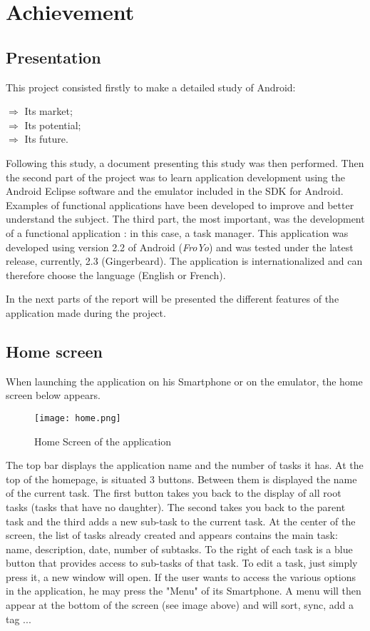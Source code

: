 \chapter{Achievement}

\section{Presentation}

This project consisted firstly to make a detailed study of Android:
\begin{description}
    \item[$\Rightarrow$ Its market;]
    \item[$\Rightarrow$ Its potential;]
    \item[$\Rightarrow$ Its future.]
\end{description}

\noindent Following this study, a document presenting this study was then performed.
Then the second part of the project was to learn application development using the Android Eclipse software and the emulator included in the SDK for Android.
Examples of functional applications have been developed to improve and better understand the subject.
The third part, the most important, was the development of a functional application : in this case, a task manager. This application was developed using version 2.2 of Android (\textit{FroYo}) and was tested under the latest release, currently, 2.3 (Gingerbeard). The application is internationalized and can therefore choose the language (English or French).

\noindent In the next parts of the report will be presented the different features of the application made during the project.

\section{Home screen}

When launching the application on his Smartphone or on the emulator, the home screen below appears.

\begin{figure}[!ht]
    \centering
    \texttt{[image: home.png]}
    \caption{Home Screen of the application}
\end{figure}

\noindent The top bar displays the application name and the number of tasks it has.
At the top of the homepage, is situated 3 buttons. Between them is displayed the name of the current task. The first button takes you back to the display of all root tasks (tasks that have no daughter). The second takes you back to the parent task and the third adds a new sub-task to the current task.
At the center of the screen, the list of tasks already created and appears contains the main task: name, description, date, number of subtasks. To the right of each task is a blue button that provides access to sub-tasks of that task. To edit a task, just simply press it, a new window will open.
If the user wants to access the various options in the application, he may press the "Menu" of its Smartphone. A menu will then appear at the bottom of the screen (see image above) and will sort, sync, add a tag ...

